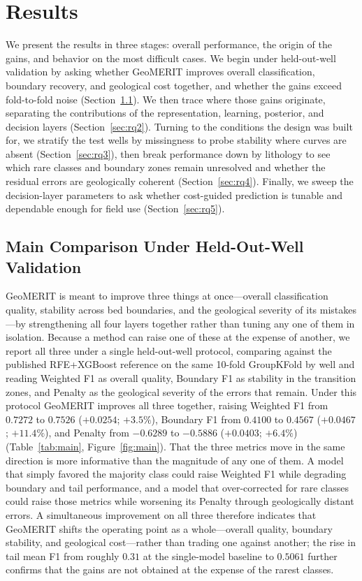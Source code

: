 \documentclass[bdcc,article,submit,pdftex,moreauthors]{Definitions/mdpi}
\begin{document}
\section{Results}
\label{sec:results}
We present the results in three stages: overall performance, the origin of the gains, and
behavior on the most difficult cases. We begin under held-out-well validation by asking
whether GeoMERIT improves overall
classification, boundary recovery, and geological cost together, and whether the gains exceed
fold-to-fold noise (Section~\ref{sec:rq1}). We then trace where those gains originate,
separating the contributions of the representation, learning, posterior, and decision layers
(Section~\ref{sec:rq2}). Turning to the conditions the design was built for, we stratify the
test wells by missingness to probe stability where curves are absent (Section~\ref{sec:rq3}),
then break performance down by lithology to see which rare classes and boundary zones remain
unresolved and whether the residual errors are geologically coherent (Section~\ref{sec:rq4}).
Finally, we sweep the decision-layer parameters to ask whether cost-guided prediction is
tunable and dependable enough for field use (Section~\ref{sec:rq5}).

\subsection{Main Comparison Under Held-Out-Well Validation}
\label{sec:rq1}
GeoMERIT is meant to improve three things at once---overall classification quality, stability
across bed boundaries, and the geological severity of its mistakes---by strengthening all four
layers together rather than tuning any one of them in isolation. Because a method can raise one
of these at the expense of another, we report all three under a single held-out-well protocol,
comparing against the published RFE+XGBoost reference on the same 10-fold GroupKFold by well and
reading Weighted F1 as overall quality, Boundary F1 as stability in the transition zones, and
Penalty as the geological severity of the errors that remain. Under this protocol
GeoMERIT improves all three together, raising Weighted F1 from $0.7272$ to $0.7526$
($+0.0254$; $+3.5\%$), Boundary F1 from $0.4100$ to $0.4567$ ($+0.0467$; $+11.4\%$), and
Penalty from $-0.6289$ to $-0.5886$ ($+0.0403$; $+6.4\%$) (Table~\ref{tab:main},
Figure~\ref{fig:main}). That the three metrics move in the same direction is more informative than the magnitude of
any one of them. A model that simply favored the majority class could raise Weighted F1 while
degrading boundary and tail performance, and a model that over-corrected for rare classes could
raise those metrics while worsening its Penalty through geologically distant errors. A
simultaneous improvement on all three therefore indicates that GeoMERIT shifts the operating
point as a whole---overall quality, boundary stability, and geological cost---rather than
trading one against another; the rise in tail mean F1 from roughly $0.31$ at the single-model
baseline to $0.5061$ further confirms that the gains are not obtained at the expense of the
rarest classes.
\end{document}
